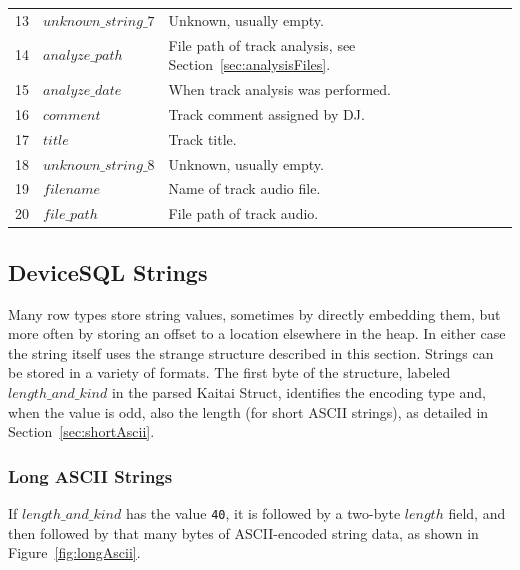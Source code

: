 \documentclass[11pt]{article}
\begin{document}
\begin{longtabu}{rlX}
  13 & $unknown\_string\_7$ & Unknown, usually empty. \\

  14 & $analyze\_path$ & File path of track analysis, see
  Section~\ref{sec:analysisFiles}. \\

  15 & $analyze\_date$ & When track analysis was performed. \\

  16 & $comment$ & Track comment assigned by DJ. \\

  17 & $title$ & Track title. \\

  18 & $unknown\_string\_8$ & Unknown, usually empty. \\

  19 & $filename$ & Name of track audio file. \\

  20 & $file\_path$ & File path of track audio. \\

\end{longtabu}

\subsection{DeviceSQL Strings}
\label{sec:deviceSqlStrings}

Many row types store string values, sometimes by directly embedding
them, but more often by storing an offset to a location elsewhere in
the heap. In either case the string itself uses the strange structure
described in this section. Strings can be stored in a variety of
formats. The first byte of the structure, labeled $length\_and\_kind$
in the parsed Kaitai Struct, identifies the encoding type and, when
the value is odd, also the length (for short ASCII strings), as
detailed in Section~\ref{sec:shortAscii}.

\subsubsection{Long ASCII Strings}

If $length\_and\_kind$ has the value {\tt 40}, it is followed by a
two-byte $length$ field, and then followed by that many bytes of
ASCII-encoded string data, as shown in Figure~\ref{fig:longAscii}.
\end{document}
